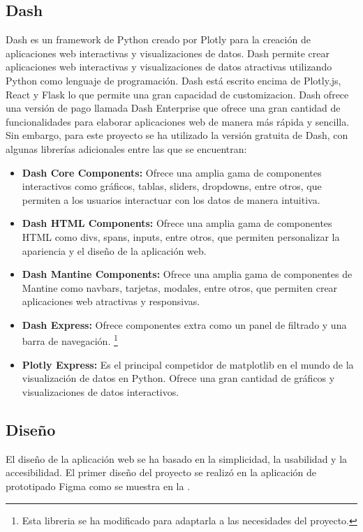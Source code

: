 \subsection{Dash}
Dash es un framework de Python creado por Plotly para la creación de aplicaciones web interactivas y visualizaciones de datos. Dash permite crear aplicaciones web interactivas y visualizaciones de datos atractivas utilizando Python como lenguaje de programación. Dash está escrito encima de Plotly.js, React y Flask lo que permite una gran capacidad de customizacion.
Dash ofrece una versión de pago llamada Dash Enterprise que ofrece una gran cantidad de funcionalidades para elaborar aplicaciones web de manera más rápida y sencilla. Sin embargo, para este proyecto se ha utilizado la versión gratuita de Dash, con algunas librerías adicionales entre las que se encuentran:
\begin{itemize}
	\item \textbf{Dash Core Components:} Ofrece una amplia gama de componentes interactivos como gráficos, tablas, sliders, dropdowns, entre otros, que permiten a los usuarios interactuar con los datos de manera intuitiva.
	\item \textbf{Dash HTML Components:} Ofrece una amplia gama de componentes HTML como divs, spans, inputs, entre otros, que permiten personalizar la apariencia y el diseño de la aplicación web.
	\item \textbf{Dash Mantine Components:} Ofrece una amplia gama de componentes de Mantine como navbars, tarjetas, modales, entre otros, que permiten crear aplicaciones web atractivas y responsivas.
	\item \textbf{Dash Express:} Ofrece componentes extra como un panel de filtrado y una barra de navegación. \footnote{Esta libreria se ha modificado para adaptarla a las necesidades del proyecto.}
	\item \textbf{Plotly Express:} Es el principal competidor de matplotlib en el mundo de la visualización de datos en Python. Ofrece una gran cantidad de gráficos y visualizaciones de datos interactivos.
\end{itemize}

\subsection{Diseño}
El diseño de la aplicación web se ha basado en la simplicidad, la usabilidad y la accesibilidad. El primer diseño del proyecto se realizó en la aplicación de prototipado Figma como se muestra en la .

